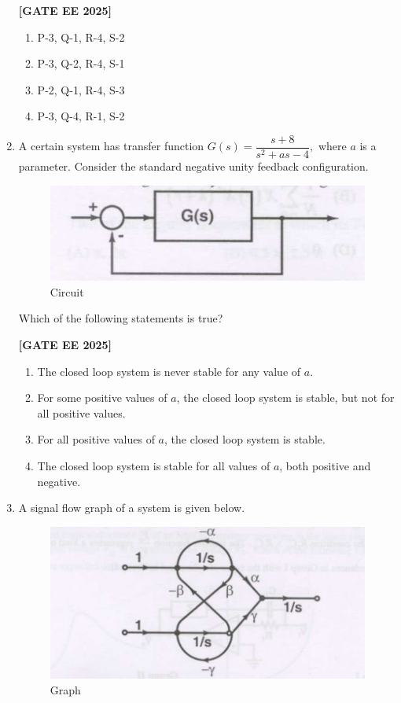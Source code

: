 \documentclass[12pt]{article}
\begin{document}
\begin{enumerate}[leftmargin=*, label=\textbf{Q.\arabic*:}]
\noindent \textbf{[GATE EE 2025]}
\begin{enumerate}
  \item P-3, Q-1, R-4, S-2
  \item P-3, Q-2, R-4, S-1
  \item P-2, Q-1, R-4, S-3
  \item P-3, Q-4, R-1, S-2
\end{enumerate}

\item A certain system has transfer function $G(s) = \dfrac{s+8}{s^2 + a s - 4},$ where $a$ is a parameter. Consider the standard negative unity feedback configuration.

\begin{figure}[H]\centering
\includegraphics[width=0.5\columnwidth]{figs/q39.png}
\caption{Circuit}
\label{fig:q39}
\end{figure}

Which of the following statements is true?
 
\noindent \textbf{[GATE EE 2025]}
\begin{enumerate}
  \item The closed loop system is never stable for any value of $a$.
  \item For some positive values of $a$, the closed loop system is stable, but not for all positive values.
  \item For all positive values of $a$, the closed loop system is stable.
  \item The closed loop system is stable for all values of $a$, both positive and negative.
\end{enumerate}
\newpage
\item A signal flow graph of a system is given below.

\begin{figure}[H]\centering
\includegraphics[width=0.5\columnwidth]{figs/q40.png}
\caption{Graph}
\label{fig:q40}
\end{figure}



\end{enumerate}
\end{document}
